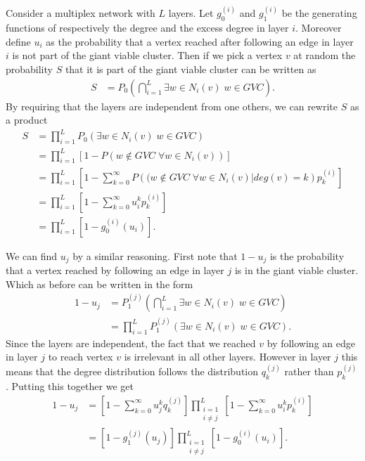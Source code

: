 \documentclass[
11pt, %
english, %
singlespacing, %
liststotoc, %
headsepline, %
]{MastersDoctoralThesis} %
\begin{document}
Consider a multiplex network with $L$ layers. Let $g_0^{(i)}$ and $g_1^{(i)}$ be the generating functions of respectively the degree and the excess degree in layer $i$. Moreover define $u_i$ as the probability that a vertex reached after following an edge in layer $i$ is not part of the giant viable cluster. Then if we pick a vertex $v$ at random the probability $S$ that it is part of the giant viable cluster can be written as
\begin{align}
	S &= P_0\left(\bigcap_{i = 1}^{L} \exists w \in N_i(v) \; w \in GVC \right).
\end{align}
By requiring that the layers are independent from one others, we can rewrite $S$ as a product
\begin{align}
	S &= \prod_{i = 1}^{L}  P_0\left(\exists w \in N_i(v) \; w \in GVC\right) \\
		&=\prod_{i = 1}^{L}  \left[1 - P\left(w \notin GVC \; \forall w \in N_i(v)\right) \right] \\
		&=\prod_{i = 1}^{L}  \left[1 - \sum_{k = 0}^{\infty} P\left((w \notin GVC \; \forall w \in N_i(v) | deg(v) = k \right) p^{(i)}_k \right] \\
		&=\prod_{i = 1}^{L}  \left[1 - \sum_{k = 0}^{\infty} u_i^k p^{(i)}_k \right] \\
		&=\prod_{i = 1}^{L}  \left[1 - g_0^{(i)}(u_i) \right].\label{Multiplex GCC size final}
\end{align}

We can find $u_j$ by a similar reasoning. First note that $1 - u_j$ is the probability that a vertex reached by following an edge in layer $j$ is in the giant viable cluster. Which as before can be written in the form
\begin{align}
	1 - u_j &= P_1^{(j)}\left(\bigcap_{i = 1}^{L} \exists w \in N_i(v) \; w \in GVC\right)\\
	&= \prod_{i = 1}^{L}  P_1^{(j)}\left(\exists w \in N_i(v) \; w \in GVC \right).
\end{align}
Since the layers are independent, the fact that we reached $v$ by following an edge in layer $j$ to reach vertex $v$ is irrelevant in all other layers. However in layer $j$ this means that the degree distribution follows the distribution $q_k^{(j)}$ rather than $p_k^{(j)}$. Putting this together we get
\begin{align}
	1 - u_j &= \left[1 - \sum_{k = 0}^{\infty} u_j^k q_k^{(j)} \right] \prod_{\substack{i = 1 \\ i \neq j}}^{L}  \left[1 - \sum_{k = 0}^{\infty} u_i^k p^{(i)}_k \right] \\
	&= \left[1 - g_1^{(j)}(u_j) \right] \prod_{\substack{i = 1 \\ i \neq j}}^{L}  \left[1 - g_0^{(i)}(u_i) \right]. \label{Multiplex u final}
\end{align}
\end{document}
